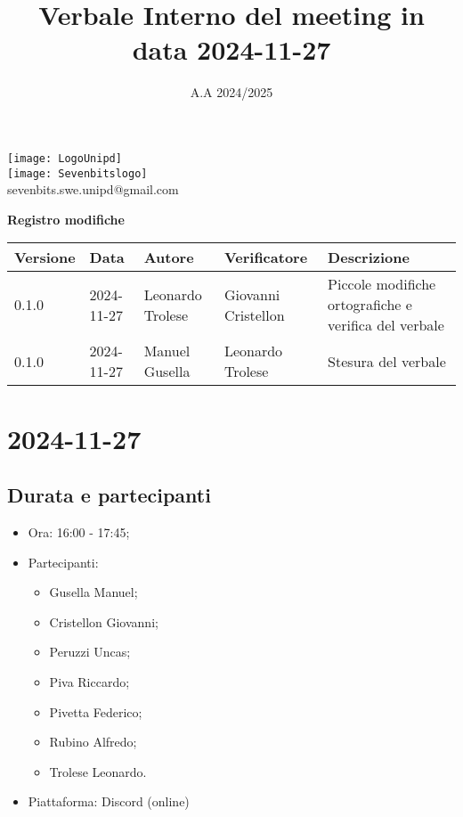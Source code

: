 \documentclass[10pt]{article}
\title{Verbale Interno del meeting in data 2024-11-27}
\date{A.A 2024/2025}
\begin{document}
\maketitle
\begin{center}
\texttt{[image: LogoUnipd]}\\
\texttt{[image: Sevenbitslogo]}\\
sevenbits.swe.unipd@gmail.com\\
\vspace{2mm}

\textbf{Registro modifiche}\\
\vspace{2mm}
\begin{tabularx}{\textwidth}{|l|l|l|l|X|}
\hline
\textbf{Versione} & \textbf{Data} & \textbf{Autore} & \textbf{Verificatore} & \textbf{Descrizione} \\
\hline
0.1.0 & 2024-11-27 & Leonardo Trolese & Giovanni Cristellon & Piccole modifiche ortografiche e verifica del verbale\\
\hline
0.1.0 & 2024-11-27 & Manuel Gusella & Leonardo Trolese & Stesura del verbale\\
\hline
\end{tabularx}
\end{center}

\newpage
\tableofcontents
\newpage
\section{2024-11-27}
\subsection{Durata e partecipanti}
\begin{itemize}
\item Ora: 16:00 - 17:45;
\item Partecipanti: 	
	\begin{itemize}
	\item Gusella Manuel;
	\item Cristellon Giovanni;
	\item Peruzzi Uncas;
	\item Piva Riccardo;
	\item Pivetta Federico;
	\item Rubino Alfredo;
	\item Trolese Leonardo.
	\end{itemize}
\item Piattaforma: Discord (online)
\end{itemize}
\end{document}
